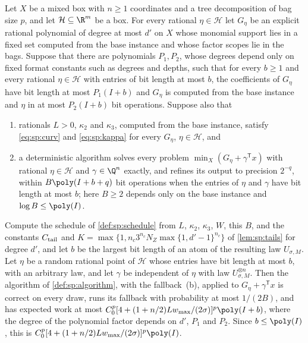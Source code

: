 \begin{lemma}\label{lem:con:uniform}
Let $X$ be a mixed box with $n\ge1$ coordinates and a tree decomposition of
bag size $p$, and let $\mathcal H\subseteq\R^m$ be a box. For every rational
$\eta\in\mathcal H$ let $G_\eta$ be an explicit rational polynomial of degree
at most $d'$ on $X$ whose monomial support lies in a fixed set computed from
the base instance and whose factor scopes lie in the bags. Suppose that there
are polynomials $P_1,P_2$, whose degrees depend only on fixed format
constants such as degrees and depths, such that for every $b\ge1$ and every
rational $\eta\in\mathcal H$ with entries of bit length at most $b$, the
coefficients of $G_\eta$ have bit length at most $P_1(I+b)$ and $G_\eta$ is
computed from the base instance and $\eta$ in at most $P_2(I+b)$ bit
operations. Suppose also that
\begin{enumerate}[label=(\alph*)]
\item rationals $L>0$, $\kappa_2$ and $\kappa_3$, computed from the base
instance, satisfy \eqref{eq:sp:curv} and \eqref{eq:sp:kappa} for every
$G_\eta$, $\eta\in\mathcal H$, and
\item a deterministic algorithm solves every problem
$\min_X(G_\eta+\gamma^{\mathsf T}x)$ with rational $\eta\in\mathcal H$ and
$\gamma\in\Q^n$ exactly, and refines its output to precision $2^{-q}$,
within $B\poly(I+b+q)$ bit operations when the entries of $\eta$ and
$\gamma$ have bit length at most $b$; here $B\ge2$ depends only on the base
instance and $\log B\le\poly(I)$.
\end{enumerate}
Compute the schedule of \cref{def:sp:schedule} from $L$, $\kappa_2$,
$\kappa_3$, $W$, this $B$, and the constants $C_{\rm tail}$ and
$K=\max\{1,n_c3^{n_c}N_Z\max\{1,d'-1\}^{n_c}\}$ of \cref{lem:sp:tails} for
degree $d'$, and let $b$ be the largest bit length of an atom of the
resulting law $U_{\sigma,M}$. Let $\eta$ be a random rational point of
$\mathcal H$ whose entries have bit length at most $b$, with an arbitrary
law, and let $\gamma$ be independent of $\eta$ with law
$U_{\sigma,M}^{\otimes n}$. Then the algorithm of \cref{def:sp:algorithm},
with the fallback~(b), applied to $G_\eta+\gamma^{\mathsf T}x$ is correct
on every draw, runs its fallback with probability at most $1/(2B)$, and has
expected work at most $C_0^p[4+(1+n/2)Lw_{\max}/(2\sigma)]^p\poly(I+b)$,
where the degree of the polynomial factor depends on $d'$, $P_1$ and $P_2$.
Since $b\le\poly(I)$, this is $C_0^p[4+(1+n/2)Lw_{\max}/(2\sigma)]^p\poly(I)$.
\end{lemma}

